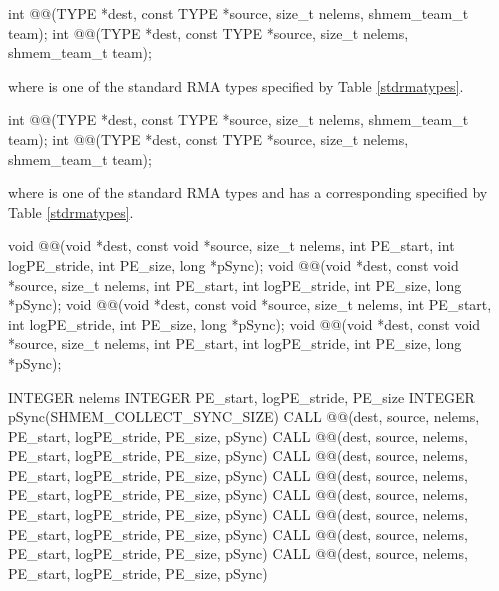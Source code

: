
\begin{apidefinition}

{\color{Green}
\begin{C11synopsis}
int @@(TYPE *dest, const TYPE *source, size_t nelems, shmem_team_t team);
int @@(TYPE *dest, const TYPE *source, size_t nelems, shmem_team_t team);
\end{C11synopsis}
where \TYPE{} is one of the standard \ac{RMA} types specified by Table
\ref{stdrmatypes}.
}

{\color{Green}
\begin{Csynopsis}
int @@(TYPE *dest, const TYPE *source, size_t nelems, shmem_team_t team);
int @@(TYPE *dest, const TYPE *source, size_t nelems, shmem_team_t team);
\end{Csynopsis}
where \TYPE{} is one of the standard \ac{RMA} types and has a corresponding
\TYPENAME{} specified by Table \ref{stdrmatypes}.
}
\begin{DeprecateBlock}
\begin{CsynopsisCol}
void @@(void *dest, const void *source, size_t nelems, int PE_start, int logPE_stride, int PE_size, long *pSync);
void @@(void *dest, const void *source, size_t nelems, int PE_start, int logPE_stride, int PE_size, long *pSync);
void @@(void *dest, const void *source, size_t nelems, int PE_start, int logPE_stride, int PE_size, long *pSync);
void @@(void *dest, const void *source, size_t nelems, int PE_start, int logPE_stride, int PE_size, long *pSync);
\end{CsynopsisCol}
\end{DeprecateBlock}

\begin{Fsynopsis}
INTEGER nelems
INTEGER PE_start, logPE_stride, PE_size
INTEGER pSync(SHMEM_COLLECT_SYNC_SIZE)
CALL @@(dest, source, nelems, PE_start, logPE_stride, PE_size, pSync)
CALL @@(dest, source, nelems, PE_start, logPE_stride, PE_size, pSync)
CALL @@(dest, source, nelems, PE_start, logPE_stride, PE_size, pSync)
CALL @@(dest, source, nelems, PE_start, logPE_stride, PE_size, pSync)
CALL @@(dest, source, nelems, PE_start, logPE_stride, PE_size, pSync)
CALL @@(dest, source, nelems, PE_start, logPE_stride, PE_size, pSync)
CALL @@(dest, source, nelems, PE_start, logPE_stride, PE_size, pSync)
CALL @@(dest, source, nelems, PE_start, logPE_stride, PE_size, pSync)
\end{Fsynopsis}


\end{apidefinition}
